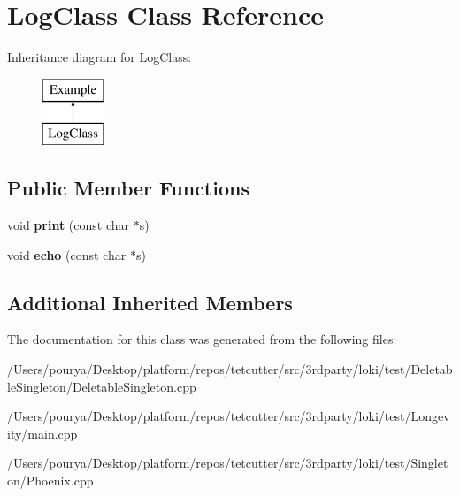 \hypertarget{classLogClass}{}\section{Log\+Class Class Reference}
\label{classLogClass}
Inheritance diagram for Log\+Class\+:\begin{figure}[H]
\begin{center}
\leavevmode
\includegraphics[height=2.000000cm]{classLogClass}
\end{center}
\end{figure}
\subsection*{Public Member Functions}
\begin{DoxyCompactItemize}
\item 
\hypertarget{classLogClass_afb7dfa98bba08b9d3e7fbeb78b877b73}{}void {\bfseries print} (const char $\ast$s)\label{classLogClass_afb7dfa98bba08b9d3e7fbeb78b877b73}

\item 
\hypertarget{classLogClass_a62e349df3f22deb09ebccb781f326942}{}void {\bfseries echo} (const char $\ast$s)\label{classLogClass_a62e349df3f22deb09ebccb781f326942}

\end{DoxyCompactItemize}
\subsection*{Additional Inherited Members}


The documentation for this class was generated from the following files\+:\begin{DoxyCompactItemize}
\item 
/\+Users/pourya/\+Desktop/platform/repos/tetcutter/src/3rdparty/loki/test/\+Deletable\+Singleton/Deletable\+Singleton.\+cpp\item 
/\+Users/pourya/\+Desktop/platform/repos/tetcutter/src/3rdparty/loki/test/\+Longevity/main.\+cpp\item 
/\+Users/pourya/\+Desktop/platform/repos/tetcutter/src/3rdparty/loki/test/\+Singleton/Phoenix.\+cpp\end{DoxyCompactItemize}
